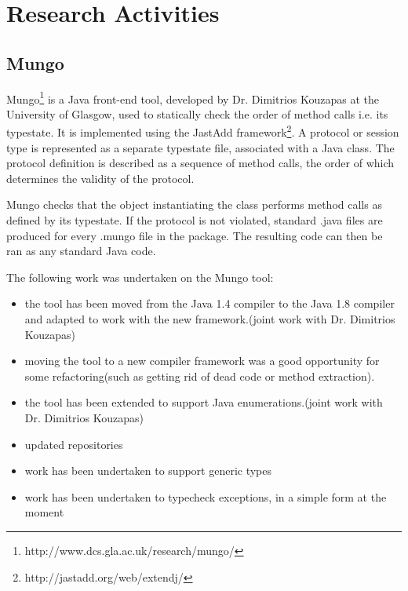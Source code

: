 \section{Research Activities}
\label{sec:Research}

\subsection{Mungo}
\label{sub:Mungo}
Mungo\footnote{http://www.dcs.gla.ac.uk/research/mungo/} is a Java front-end tool, developed by Dr. Dimitrios Kouzapas at the University of Glasgow, used to statically check the order of method calls i.e. its typestate. It is implemented using the JastAdd framework\footnote{http://jastadd.org/web/extendj/}\cite{jastadd}. A protocol or session type is represented as a separate typestate file, associated with a Java class.  The protocol definition is described as a sequence of method calls, the order of which determines the validity of the protocol.

Mungo checks that the object instantiating the class performs method calls as defined by its typestate. If the protocol is not violated, standard .java files are produced for every .mungo file in the package.  The resulting code can then be ran as any standard Java code.


The following work was undertaken on the Mungo tool:
\begin{itemize}
  \item the tool has been moved from the Java 1.4 compiler to the Java 1.8 compiler and adapted to work with the new framework.(joint work with Dr. Dimitrios Kouzapas)
  \item moving the tool to a new compiler framework was a good opportunity for some refactoring(such as getting rid of dead code or method extraction).
  \item the tool has been extended to support Java enumerations.(joint work with Dr. Dimitrios Kouzapas)
  \item updated repositories
  \item work has been undertaken to support generic types
  \item work has been undertaken to typecheck exceptions, in a simple form at the moment
\end{itemize}


